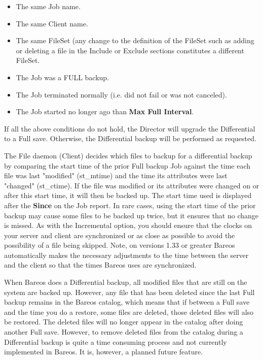 \begin{description}
\begin{description}
\begin{itemize}
\item The same Job name.
\item The same Client name.
\item The same FileSet (any change to the definition of  the FileSet such as
adding or deleting a file in the  Include or Exclude sections constitutes a
different FileSet.
\item The Job was a FULL backup.
\item The Job terminated normally (i.e. did not fail or was not  canceled).
\item The Job started no longer ago than {\bf Max Full Interval}.
\end{itemize}

If all the above conditions do not hold, the Director will  upgrade the
Differential to a Full save. Otherwise, the  Differential backup will be
performed as requested.

The File daemon (Client) decides which files to backup for a
differential backup by comparing the start time of the prior Full backup
Job against the time each file was last "modified" (st\_mtime) and the
time its attributes were last "changed" (st\_ctime).  If the file was
modified or its attributes were changed on or after this start time, it
will then be backed up.  The start time used is displayed after the {\bf
Since} on the Job report.  In rare cases, using the start time of the
prior backup may cause some files to be backed up twice, but it ensures
that no change is missed.  As with the Incremental option, you should
ensure that the clocks on your server and client are synchronized or as
close as possible to avoid the possibility of a file being skipped.
Note, on versions 1.33 or greater Bareos automatically makes the
necessary adjustments to the time between the server and the client so
that the times Bareos uses are synchronized.

When Bareos does a Differential backup, all modified files that are
still on the system are backed up.  However, any file that has been
deleted since the last Full backup remains in the Bareos catalog, which
means that if between a Full save and the time you do a restore, some
files are deleted, those deleted files will also be restored.  The
deleted files will no longer appear in the catalog after doing another
Full save.  However, to remove deleted files from the catalog during a
Differential backup is quite a time consuming process and not currently
implemented in Bareos.  It is, however, a planned future feature.


\end{description}
\end{description}
